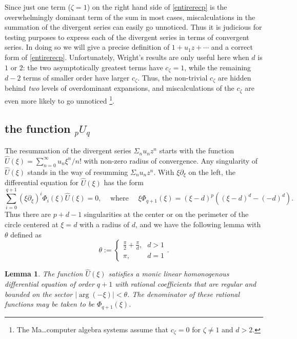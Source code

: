 \documentclass[12pt]{article}
\numberwithin{equation}{section}
\newtheorem{lemma}[theorem]{Lemma}
\begin{document}
Since just one term ($\zeta=1$) on the right hand side of \eqref{entirerecp} is the overwhelmingly dominant term of the sum in most cases, miscalculations in the summation of the divergent series can easily go unnoticed. Thus it is judicious for testing purposes to express each of the divergent series in terms of convergent series. In doing so we will give a precise definition of $1 + u_1 z + \cdots$ and a correct form of \eqref{entirerecp}. Unfortunately, Wright's results are only useful here when $d$ is $1$ or $2$: the two asymptotically greatest terms have $c_{\zeta}=1$, while the remaining $d-2$ terms of smaller order have larger $c_{\zeta}$. Thus, the non-trivial $c_{\zeta}$ are hidden behind \emph{two} levels of overdominant expansions, and miscalculations of the $c_{\zeta}$ are even more likely to go unnoticed \footnote{The Ma\dots computer algebra systems assume that $c_\zeta = 0$ for $\zeta \neq 1$ and $d>2$.}.

\subsection{the function ${}_p U_q$}
The resummation of the divergent series $\Sigma_n u_n z^n$ starts with the function $\hat{U}(\xi) = \sum_{n=0}^{\infty} u_n \xi^n/n!$ with non-zero radius of convergence. Any singularity of $\hat{U}(\xi)$ stands in the way of resumming $\Sigma_n u_n z^n$. With $\xi \partial_{\xi}$ on the left, the differential equation for $\hat{U}(\xi)$ has the form
\begin{equation*}
\sum_{i=0}^{q+1} (\xi \partial_\xi)^i \Phi_{i}(\xi)\hat{U}(\xi) = 0\text{,} \quad \text{ where } \quad \xi \Phi_{q+1}(\xi) = (\xi-d)^p ((\xi-d)^d-(-d)^d)\text{.}
\end{equation*}
Thus there are $p+d-1$ singularities at the center or on the perimeter of the circle centered at $\xi=d$ with a radius of $d$, and we have the following lemma with $\theta$ defined as
\begin{equation*}
\theta := \begin{cases}
\frac{\pi}{2} + \frac{\pi}{d}\text{,} & d > 1\\
\pi\text{,} & d = 1
\end{cases}\text{.}
\end{equation*}
\begin{lemma}
The function $\hat{U}(\xi)$ satisfies a monic linear homonogenous differential equation of order $q+1$ with rational coefficients that are regular and bounded on the sector $|\arg(-\xi)| < \theta$. The denominator of these rational functions may be taken to be $\Phi_{q+1}(\xi)$.
\end{lemma}
\end{document}
